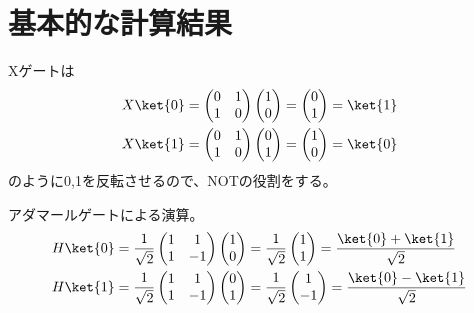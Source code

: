 \documentclass[]{ltjsarticle}
\begin{document}
\section{基本的な計算結果}
Xゲートは
\begin{align}
    X\ket{0} 
    &=
    \begin{pmatrix}
        0 & 1 \\ 1 & 0 
    \end{pmatrix} 
    \begin{pmatrix}
        1 \\ 0 
    \end{pmatrix} 
    =
    \begin{pmatrix}
        0 \\ 1 
    \end{pmatrix}
    =
    \ket{1}  \\
    X\ket{1} 
    &=
    \begin{pmatrix}
        0 & 1 \\ 1 & 0 
    \end{pmatrix} 
    \begin{pmatrix}
        0 \\ 1 
    \end{pmatrix} 
    =
    \begin{pmatrix}
        1 \\ 0 
    \end{pmatrix}
    =
    \ket{0}
\end{align}
のように0,1を反転させるので、NOTの役割をする。


アダマールゲートによる演算。
\begin{align}
    H \ket{0}
    &=
    \frac{1}{\sqrt{2}}
    \begin{pmatrix}
        1 & 1 \\
        1 & -1
    \end{pmatrix}
    \begin{pmatrix}
        1 \\ 0
    \end{pmatrix}
    =
    \frac{1}{\sqrt{2}}
    \begin{pmatrix}
        1 \\ 1
    \end{pmatrix}
    =
    \frac{\ket{0} + \ket{1}}{\sqrt{2}} \\
    H \ket{1}
    &=
    \frac{1}{\sqrt{2}}
    \begin{pmatrix}
        1 & 1 \\
        1 & -1
    \end{pmatrix}
    \begin{pmatrix}
        0 \\ 1
    \end{pmatrix}
    =
    \frac{1}{\sqrt{2}}
    \begin{pmatrix}
        1 \\ -1
    \end{pmatrix}
    =
    \frac{\ket{0} - \ket{1}}{\sqrt{2}}
\end{align}
\end{document}
